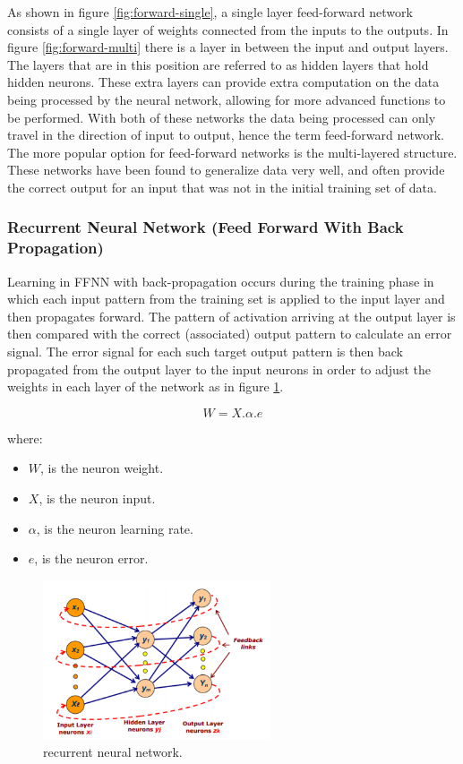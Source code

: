 \documentclass[12pt, a4paper, twoside]{report}
\begin{document}
As shown in figure \ref{fig:forward-single}, a single layer feed-forward network consists of a single layer of  weights connected from the inputs to the outputs. In figure \ref{fig:forward-multi} there is a layer in between the input and output layers. The layers that are in this position are referred to as hidden layers that hold hidden neurons. These extra layers can provide extra computation on the data being processed by the neural network, allowing for more advanced functions to be performed. With both of these networks the data being processed can only travel in the direction of input to output, hence the term feed-forward network. The more popular option for feed-forward networks is the multi-layered structure. These networks have been found to generalize data very well, and often provide the correct output for an input that was not in the initial training set of data.

\subsubsection{Recurrent Neural Network (Feed Forward With Back Propagation)}
Learning in FFNN with back-propagation occurs during the training phase in which each input pattern from the training set is applied to the input layer and then propagates forward. The pattern of activation arriving at the output layer is then compared with the correct (associated) output pattern to calculate an error signal.  The error signal for each such target output pattern is then back propagated from the output layer to the input neurons in order to adjust the weights in each layer of the network as in figure \ref{fig:rnn}.

\begin{equation*}
W = X . \alpha . e
\end{equation*}

where:
\begin{itemize}
\item $W$, is the neuron weight.
\item $X$, is the neuron input.
\item $\alpha$, is the neuron learning rate.
\item $e$, is the neuron error.
\end{itemize}

\begin{figure}[ht]
	\centering
	\includegraphics[width=0.6\textwidth]
	{images/chapter4/rnn}
	\caption{recurrent neural network.}
	\label{fig:rnn}
\end{figure}
\end{document}
